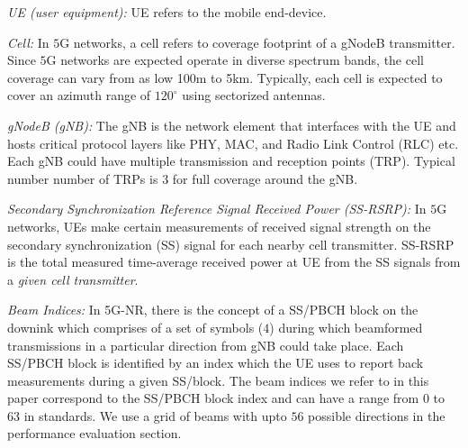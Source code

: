 \documentclass[conference, 10pt]{IEEEtran}
\begin{document}
{\em UE (user equipment):} UE refers to the mobile end-device.

{\em Cell:} In $5$G networks, a cell refers to coverage footprint of a gNodeB transmitter. Since $5$G networks are expected operate in diverse spectrum bands, the cell coverage can vary from as low 100m to 5km. Typically, each cell is expected to cover an azimuth range of $120^\circ$ using sectorized antennas.

{\em gNodeB (gNB):} The gNB is the network element that interfaces with the UE and
hosts critical protocol layers like PHY, MAC, and Radio Link Control (RLC) etc. Each
gNB could have multiple transmission and reception points (TRP). Typical number number of TRPs is $3$ for full coverage around the gNB.

{\em Secondary Synchronization Reference Signal Received Power (SS-RSRP):} In $5$G networks, UEs make certain
measurements of received signal strength on the secondary synchronization (SS) signal for each nearby cell transmitter. SS-RSRP is
the total measured time-average received power at UE from the SS signals 
from a {\em given cell transmitter}. 

{\em Beam Indices:} In 5G-NR, there is the concept of a SS/PBCH block on the downink which comprises of a set of symbols ($4$) during which beamformed transmissions in a particular direction from gNB could take place. Each SS/PBCH block is identified by an index which the UE uses to report back measurements during a given SS/block. The beam indices we refer to in this paper correspond to the SS/PBCH block index and can have a range from $0$ to $63$ in standards. We use a grid of beams with upto $56$ possible directions in the performance evaluation section.  




\end{document}

